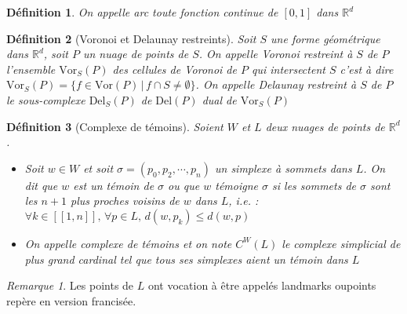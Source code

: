 \documentclass{report}
\newcommand{\R}{\mathbb{R}}
\newcommand{\Vor}{\mathrm{Vor}}
\newcommand{\Del}{\mathrm{Del}}
\newtheorem{definition}{Définition}
\theoremstyle{remark}
\newtheorem*{rmq}{Remarque}
\begin{document}
\begin{definition}
	On appelle \textnormal{arc} toute fonction continue de $[0,1]$ dans $\R^d$
\end{definition}

\begin{definition}[Voronoi et Delaunay restreints]
	Soit $S$ une forme géométrique dans $\R^d$, soit $P$ un nuage de points de $S$. On appelle \textnormal{Voronoi restreint à $S$ de $P$} l'ensemble $\Vor_S(P)$ des cellules de Voronoi de $P$ qui intersectent $S$ c'est à dire $\Vor_S(P) = \{f\in\Vor(P)\,|\,f\cap S\neq\emptyset\}$. On appelle \textnormal{Delaunay restreint à $S$ de $P$} le sous-complexe $\Del_S(P)$ de $\Del(P)$ dual de $\Vor_S(P)$
\end{definition}

\begin{definition}[Complexe de témoins]
	Soient $W$ et $L$ deux nuages de points de $\R^d$.
	\begin{itemize}
	\item[$\bullet$] Soit $w\in W$ et soit $\sigma = (p_0, p_2, \cdots, p_n)$ un simplexe à sommets dans $L$. On dit que $w$ est un \textnormal{témoin} de $\sigma$ ou que $w$ \textnormal{témoigne} $\sigma$ si les sommets de $\sigma$ sont les $n+1$ plus proches voisins de $w$ dans $L$, i.e. : $\forall k\in[\![1,n]\!],\, \forall p\in L,\, d(w, p_k)\leq d(w, p)$
	\item[$\bullet$] On appelle \textnormal{complexe de témoins} et on note $C^W(L)$ le complexe simplicial de plus grand cardinal tel que tous ses simplexes aient un témoin dans $L$
	\end{itemize}
\end{definition}

\begin{rmq}
	Les points de $L$ ont vocation à être appelés landmarks oupoints repère en version francisée.
\end{rmq}
\end{document}
